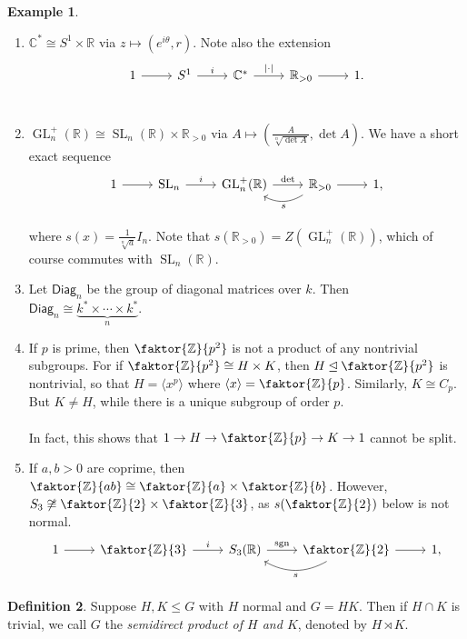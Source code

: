 \documentclass[10pt,letterpaper,cm]{nupset}
\theoremstyle{definition}
\newtheorem{definition}{Definition}[subsection]
\newtheorem{exmp}[definition]{Example}
\theoremstyle{theorem}
\theoremstyle{remark}
\newcommand{\C}{\mathbb C}
\newcommand{\R}{\mathbb R}
\newcommand{\Z}{\mathbb Z}
\newcommand{\1}{\mathbf{1}}
\newcommand{\0}{\vec 0}
\DeclareMathOperator*{\GL}{GL}
\DeclareMathOperator*{\SL}{SL}
\DeclareMathOperator{\sgn}{sgn}
\begin{document}
\begin{exmp} $ $
\begin{enumerate}
\item $\C^{\ast} \cong S^1 \times \R$ via $z \mapsto (e^{i\theta}, r)$. Note also the extension \[
	\begin{tikzcd}
	1\rar & S^1\rar["i" above] & \C^{\ast}\rar["|\cdot|" above] & \R_{>0}\rar & 1. \\
	\end{tikzcd}
\]
\item $\GL_n^{+}(\R) \cong \SL_n(\R) \times \R_{>0}$ via $A\mapsto (\frac{A}{\sqrt[n]{\det A}}, \det A)$.
We have a short exact sequence  \[
	\begin{tikzcd}
	1\rar & \SL_n\rar["i" above] & \GL_n^{+}(\R)\rar["\det" above] & \R_{>0}\rar\lar[bend left=30,"s" below] & 1, \\
	\end{tikzcd}
\] where $s(x) = \frac{1}{\sqrt[n]{a}}I_n$. Note that $s(\R_{>0}) = Z(\GL_n^+(\R))$, which of course commutes with $\SL_n(\R)$.
\item Let $\mathsf{Diag}_n$ be the group of diagonal matrices over $k$. Then $\mathsf{Diag}_n \cong \underbrace{k^{\ast}\times \cdots \times k^{\ast}}_{n}.$
\item If $p$ is prime, then $\faktor{\Z}{p^2}$ is not a product of any nontrivial subgroups. For if $\faktor{\Z}{p^2} \cong H \times K$, then $H \unlhd \faktor{\Z}{p^2}$ is nontrivial, so that $H = \langle x^p \rangle$ where $\langle x \rangle = \faktor{\Z}{p}$. Similarly, $K \cong C_p$. But $K \ne H$, while there is a unique subgroup of order $p$. \\ \\ In fact, this shows that $1 \to H \to \faktor{\Z}{p} \to K \to 1$ cannot be split.
\item If $a, b >0$ are coprime, then $\faktor{\Z}{ab} \cong \faktor{\Z}{a} \times \faktor{\Z}{b}$. However, $S_3 \not \cong \faktor{\Z}{2} \times \faktor{\Z}{3}$, as $s(\faktor{\Z}{2})$ below is not normal. 
\[
	\begin{tikzcd}
	1\rar & \faktor{\Z}{3}\rar["i" above] & S_3(\R)\rar["\sgn" above] & \faktor{\Z}{2}\rar\lar[bend left=30,"s" below] & 1, \\
	\end{tikzcd}
\] 
\end{enumerate}
\end{exmp}

\begin{definition}
Suppose $H, K\leq G$ with $H$ normal and $G = HK$. Then if $H \cap K$ is trivial, we call $G$ the \textit{semidirect product of $H$ and $K$}, denoted by $H \rtimes K$.
\end{definition}
\end{document}
